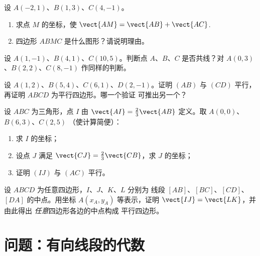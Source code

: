 \begin{exercise}[$\star\star$]\label{exo:g10:vectors:6}
设 $A(-2, 1)$、$B(1, 3)$、$C(4, -1)$。
\begin{enumerate}
  \item 求点 $M$ 的坐标，使
        $\vect{AM} = \vect{AB} + \vect{AC}$.
  \item 四边形 $ABMC$ 是什么图形？请说明理由。
\end{enumerate}
\end{exercise}

\begin{exercise}[$\star\star$]\label{exo:g10:vectors:7}
设 $A(1, -1)$、$B(4, 1)$、$C(10, 5)$。判断点 $A$、$B$、$C$
是否共线？对 $A(0, 3)$、$B(2, 2)$、$C(8, -1)$ 作同样的判断。
\end{exercise}

\begin{exercise}[$\star\star$]\label{exo:g10:vectors:8}
设 $A(1, 2)$、$B(5, 4)$、$C(6, 1)$、$D(2, -1)$。证明 $(AB)$ 与
$(CD)$ 平行，再证明 $ABCD$ 为平行四边形。哪一个验证
可推出另一个？
\end{exercise}

\begin{exercise}[$\star\star$]\label{exo:g10:vectors:9}
设 $ABC$ 为三角形，点 $I$ 由
$\vect{AI} = \frac23 \vect{AB}$ 定义。取 $A(0,0)$、$B(6, 3)$、$C(2, 5)$
（使计算简便）：
\begin{enumerate}
  \item 求 $I$ 的坐标；
  \item 设点 $J$ 满足 $\vect{CJ} = \frac23\vect{CB}$，求
        $J$ 的坐标；
  \item 证明 $(IJ)$ 与 $(AC)$ 平行。
\end{enumerate}
\end{exercise}

\begin{exercise}[$\star\star\star$]\label{exo:g10:vectors:10}
设 $ABCD$ 为任意四边形，$I$、$J$、$K$、$L$ 分别为
线段 $[AB]$、$[BC]$、$[CD]$、$[DA]$ 的中点。用坐标
$A(x_A, y_A)$ 等表示，证明 $\vect{IJ} = \vect{LK}$，并由此得出
\emph{任意}四边形各边的中点构成
平行四边形。
\end{exercise}

\section{问题：有向线段的代数}

